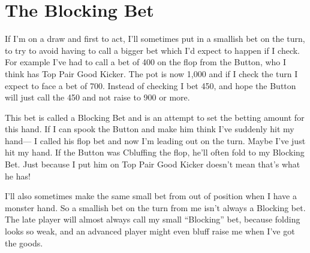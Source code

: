 \section{The Blocking Bet}

If I'm on a draw and first to act, I'll sometimes put in a smallish
bet on the turn, to try to avoid having to call a bigger bet which
I'd expect to happen if I check. For example I've had to call a bet
of 400 on the flop from the Button, who I think has Top Pair
Good Kicker. The pot is now 1,000 and if I check the turn I expect to
face a bet of 700. Instead of checking I bet 450, and hope the Button
will just call the 450 and not raise to 900 or more.

This bet is called a Blocking Bet and is an attempt to set the betting
amount for this hand. If I can spook the Button and make him think I've
suddenly hit my hand--- I called his flop bet and now I'm leading out 
on the turn. Maybe I've just hit my hand. If the Button was Cbluffing
the flop, he'll often fold to my Blocking Bet. Just because I put him
on Top Pair Good Kicker doesn't mean that's what he has!

I'll also sometimes make the same small bet from out of position
when I have a monster hand. So a smallish bet on the turn from me
isn't always a Blocking bet. The late player will almost always call
my small ``Blocking'' bet, because folding looks so weak, and an
advanced player might even bluff raise me when I've got the goods.


